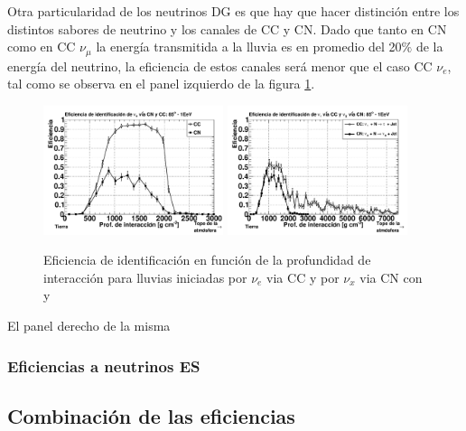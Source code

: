 	Otra particularidad de los neutrinos DG es que hay que hacer distinción entre los distintos sabores de neutrino y los canales de CC y CN.
	Dado que tanto en CN como en CC $\nu_\mu$ la energía transmitida a la lluvia es en promedio del 20$\%$ de la energía del neutrino, la eficiencia de estos canales será menor que el caso CC $\nu_e$, tal como se observa en el panel izquierdo de la figura \ref{fig:effDG_cc_nc}.
	\begin{figure}[h!]
		\begin{center}
			\includegraphics[width=0.47\textwidth]{fig/resultadosAuger/eff_CCvsNC_85}
			\hfill
			\includegraphics[width=0.47\textwidth]{fig/resultadosAuger/eff_tau_1EeV_85}
			\caption{Eficiencia de identificación en función de la profundidad de interacción para lluvias iniciadas por $\nu_e$ via CC y por $\nu_x$ via CN con  y }
			\label{fig:effDG_cc_nc}
		\end{center}
	\end{figure}
	El panel derecho de la misma 
	
	\subsubsection{Eficiencias a neutrinos ES}
	
	\subsection{Combinaci\'on de las eficiencias}
	
